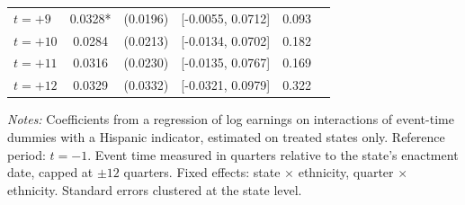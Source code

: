 \begin{table}[H]
\begin{threeparttable}
\begin{tabular}{lccccc}
$t = +9$ & 0.0328* & (0.0196) & [-0.0055, 0.0712] & 0.093 \\
$t = +10$ & 0.0284 & (0.0213) & [-0.0134, 0.0702] & 0.182 \\
$t = +11$ & 0.0316 & (0.0230) & [-0.0135, 0.0767] & 0.169 \\
$t = +12$ & 0.0329 & (0.0332) & [-0.0321, 0.0979] & 0.322 \\
\bottomrule
\end{tabular}
\begin{tablenotes}[flushleft]
\small
\item \textit{Notes:} Coefficients from a regression of log earnings on interactions of event-time dummies with a Hispanic indicator, estimated on treated states only. Reference period: $t = -1$. Event time measured in quarters relative to the state's enactment date, capped at $\pm 12$ quarters. Fixed effects: state $\times$ ethnicity, quarter $\times$ ethnicity. Standard errors clustered at the state level.
\end{tablenotes}
\end{threeparttable}
\end{table}
